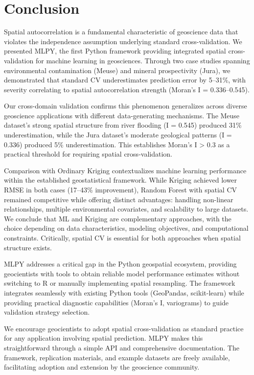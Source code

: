 \documentclass[a4paper,fleqn]{cas-sc}
\begin{document}
\section{Conclusion}
\label{sec:conclusion}

Spatial autocorrelation is a fundamental characteristic of geoscience data that violates the independence assumption underlying standard cross-validation. We presented MLPY, the first Python framework providing integrated spatial cross-validation for machine learning in geosciences. Through two case studies spanning environmental contamination (Meuse) and mineral prospectivity (Jura), we demonstrated that standard CV underestimates prediction error by 5--31\%, with severity correlating to spatial autocorrelation strength (Moran's I = 0.336--0.545).

Our cross-domain validation confirms this phenomenon generalizes across diverse geoscience applications with different data-generating mechanisms. The Meuse dataset's strong spatial structure from river flooding (I = 0.545) produced 31\% underestimation, while the Jura dataset's moderate geological patterns (I = 0.336) produced 5\% underestimation. This establishes Moran's I > 0.3 as a practical threshold for requiring spatial cross-validation.

Comparison with Ordinary Kriging contextualizes machine learning performance within the established geostatistical framework. While Kriging achieved lower RMSE in both cases (17--43\% improvement), Random Forest with spatial CV remained competitive while offering distinct advantages: handling non-linear relationships, multiple environmental covariates, and scalability to large datasets. We conclude that ML and Kriging are complementary approaches, with the choice depending on data characteristics, modeling objectives, and computational constraints. Critically, spatial CV is essential for both approaches when spatial structure exists.

MLPY addresses a critical gap in the Python geospatial ecosystem, providing geocientists with tools to obtain reliable model performance estimates without switching to R or manually implementing spatial resampling. The framework integrates seamlessly with existing Python tools (GeoPandas, scikit-learn) while providing practical diagnostic capabilities (Moran's I, variograms) to guide validation strategy selection.

We encourage geocientists to adopt spatial cross-validation as standard practice for any application involving spatial prediction. MLPY makes this straightforward through a simple API and comprehensive documentation. The framework, replication materials, and example datasets are freely available, facilitating adoption and extension by the geoscience community.
\end{document}
